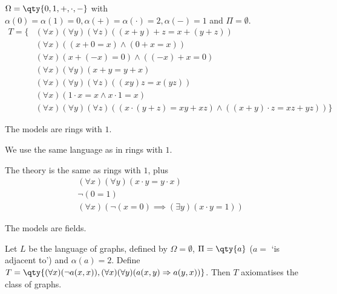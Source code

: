 \begin{example}
    $\Omega = \qty{0, 1, +, \cdot, -}$ with $\alpha(0) = \alpha(1) = 0, \alpha(+) = \alpha(\cdot) = 2, \alpha(-) = 1$ and $\Pi = \emptyset$.
    \begin{align*}
        T = \{
            &(\forall x) (\forall y) (\forall z) ((x + y) + z = x + (y + z)) \\
            &(\forall x) ((x + 0 = x) \wedge (0 + x = x)) \\
            &(\forall x) (x + (-x) = 0) \wedge ((-x) + x = 0) \\
            &(\forall x) (\forall y) (x + y = y + x) \\
            &(\forall x) (\forall y) (\forall z) ((xy)z = x(yz)) \\
            &(\forall x) (1 \cdot x = x \wedge x \cdot 1 = x) \\
            &(\forall x) (\forall y) (\forall z) ((x \cdot (y + z) = xy + xz) \wedge ((x+y) \cdot z = xz + yz))
        \}
    \end{align*}

    The models are rings with $1$.
\end{example}

\begin{example}[Fields]
    We use the same language as in rings with $1$.

    The theory is the same as rings with $1$, plus
    \begin{align*}
        &(\forall x)(\forall y) (x \cdot y = y \cdot x) \\
        &\neg(0 = 1) \\
        &(\forall x) (\neg(x = 0) \implies (\exists y)(x \cdot y = 1))
    \end{align*}

    The models are fields.

\end{example}

\begin{example}
    Let $L$ be the language of graphs, defined by $\Omega = \emptyset$, $\Pi = \qty{a}$ ($a =$ `is adjacent to') and $\alpha(a) = 2$.
    Define $T = \qty{(\forall x)(\neg a(x,x)), (\forall x)(\forall y)(a(x,y) \implies a(y,x))}$.
    Then $T$ axiomatises the class of graphs.
\end{example}

